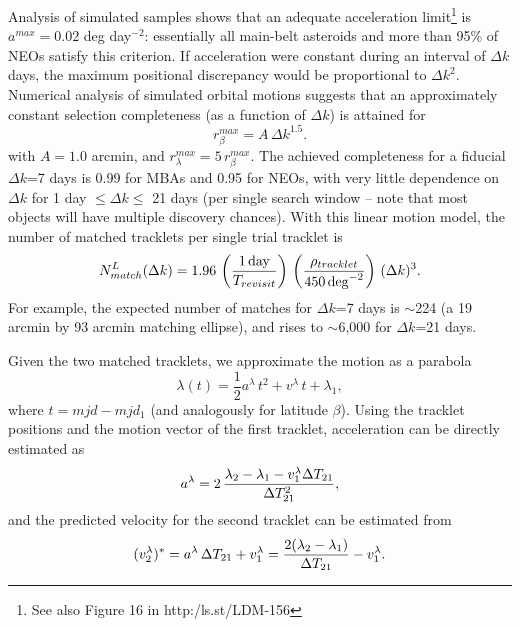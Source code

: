 Analysis of simulated samples shows that an adequate acceleration limit\footnote{See also
Figure 16 in http:/ls.st/LDM-156} is $a^{max}=0.02$ deg day$^{-2}$: essentially 
all main-belt asteroids and more than 95\% of NEOs satisfy this criterion. If acceleration
were constant during an interval of $\Delta k$ days, the maximum positional discrepancy 
would be proportional to $\Delta k^2$. Numerical analysis of simulated orbital motions
suggests that an approximately constant selection completeness (as a function of $\Delta k$)
is attained for 
\begin{equation}
\label{eq:matching1} 
                r_\beta^{max} = A \, \Delta k^{1.5}.
\end{equation}
with $A=1.0$ arcmin, and $r_\lambda^{max} = 5 \, r_\beta^{max}$. The achieved completeness for 
a fiducial $\Delta k$=7 days is 0.99 for MBAs and 0.95 for NEOs, with very little dependence
on $\Delta k$ for 1 day $\le \Delta k \le$ 21 days (per single search window -- note that most 
objects will have multiple discovery chances).  With this linear motion model, the number
of matched tracklets per single trial tracklet is 
\begin{equation}
\label{eq:Nmdk2}
   N^{L}_{match}(\Delta k) = 1.96 \, \left({1 \, {\rm day} \over T_{revisit}}\right) \, 
                    \left( \rho_{tracklet}  \over 450 \, {\rm deg}^{-2} \right) \, (\Delta k)^3.
\end{equation}
For example,  the expected number of matches for $\Delta k$=7 days is $\sim$224
(a 19 arcmin by 93 arcmin matching ellipse), and rises to $\sim$6,000 for 
$\Delta k$=21 days. 

Given the two matched tracklets, we approximate the motion as a parabola 
\begin{equation}
\label{eq:parabola}
          \lambda(t) = \frac{1}{2}a^\lambda \, t^2 + v^\lambda \, t + \lambda_1,
\end{equation} 
where $t = mjd - mjd_1$ (and analogously for latitude $\beta$).  Using the tracklet
positions and the motion vector of the first tracklet, acceleration can be directly 
estimated as 
\begin{equation}
 \label{eq:accPred}
             a^\lambda = 2 \, {\lambda_2- \lambda_1 - v_1^\lambda \Delta T_{21} \over \Delta T^2_{21}},
\end{equation}
and the predicted velocity for the second tracklet can be estimated from 
\begin{equation}
\label{eq:v2cut}
        (v^\lambda_2)^\ast =  a^\lambda \,\Delta T_{21}  + v_1^\lambda =
      {2(\lambda_2- \lambda_1) \over \Delta T_{21}}  - v_1^\lambda. 
\end{equation}

